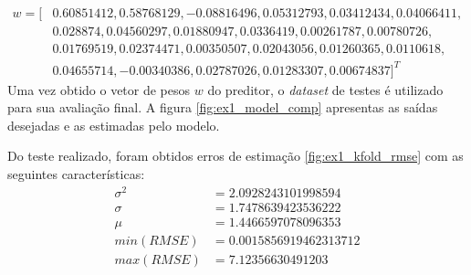 \documentclass{article}
\begin{document}
    \begin{align*}
w=[ &0.60851412, 0.58768129, -0.08816496, 0.05312793, 0.03412434, 0.04066411, \\
    &0.028874  , 0.04560297,  0.01880947, 0.0336419,  0.00261787, 0.00780726, \\
    &0.01769519, 0.02374471,  0.00350507,  0.02043056,0.01260365, 0.0110618,  \\
    & 0.04655714, -0.00340386,  0.02787026,  0.01283307,  0.00674837]^T
    \end{align*}
    Uma vez obtido o vetor de pesos $w$ do preditor, o \textit{dataset} de testes é utilizado para
    sua avaliação final. A figura \ref{fig:ex1_model_comp} apresentas as saídas desejadas e as estimadas pelo modelo.

    Do teste realizado, foram obtidos erros de estimação \ref{fig:ex1_kfold_rmse} com as seguintes características:
    \begin{align}
       \sigma^2&=2.0928243101998594\\
       \sigma&=1.7478639423536222\\
       \mu&=1.4466597078096353\\
       min(RMSE)&=0.0015856919462313712\\
       max(RMSE)&=7.12356630491203 
   \end{align}
\end{document}
